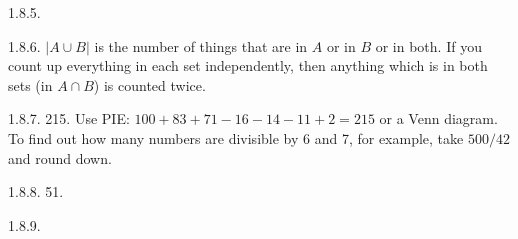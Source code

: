 \begin {itemize}
\begin{ans}{1.8.5.}
	
\end{ans}
\begin{ans}{1.8.6.}
		$|A \cup B|$ is the number of things that are in $A$ or in $B$ or in both.  If you count up everything in each set independently, then anything which is in both sets (in $A \cap B$) is counted twice.
	
\end{ans}
\begin{ans}{1.8.7.}
		215.  Use PIE: $100 + 83 + 71 - 16 - 14 -11 + 2 = 215$ or a Venn diagram.  To find out how many numbers are divisible by 6 and 7, for example, take $500/42$ and round down.
	
\end{ans}
\begin{ans}{1.8.8.}
		51.
	
\end{ans}
\begin{ans}{1.8.9.}
\end{ans}
\end{itemize}
